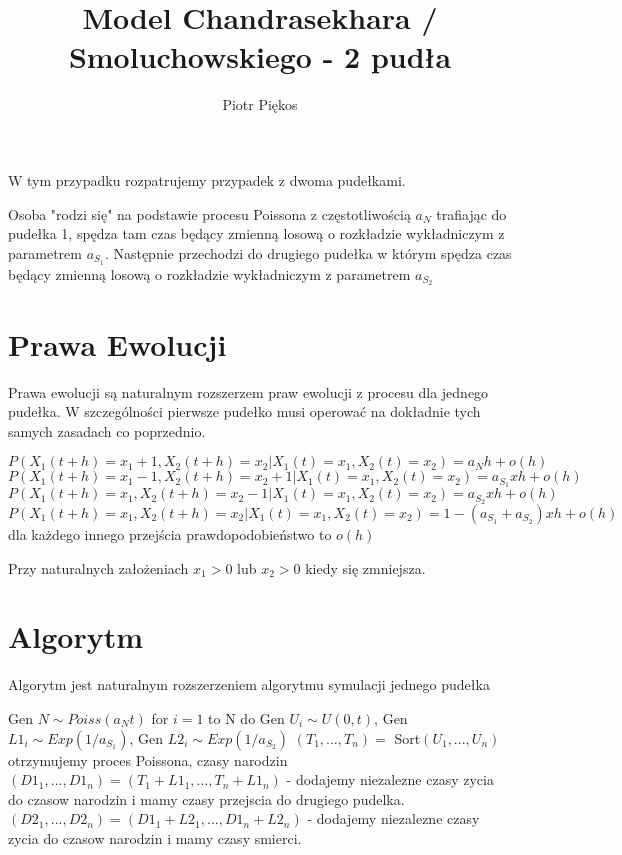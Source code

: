 \documentclass{article}
\begin{document}
\title{Model Chandrasekhara / Smoluchowskiego  - 2 pudła}
\author{Piotr Piękos}

\maketitle

W tym przypadku rozpatrujemy przypadek z dwoma pudełkami. 

Osoba "rodzi się" na podstawie procesu Poissona z częstotliwością $a_N$ trafiając do pudełka 1, spędza tam czas będący zmienną losową o rozkładzie wykładniczym z parametrem $a_{S_1}$. Następnie przechodzi do drugiego pudełka w którym spędza czas będący zmienną losową o rozkładzie wykładniczym z parametrem $a_{S_2}$
\section{Prawa Ewolucji}

Prawa ewolucji są naturalnym rozszerzem praw ewolucji z procesu dla jednego pudełka. W szczególności pierwsze pudełko musi operować na dokładnie tych samych zasadach co poprzednio.

\[P(X_1(t+h) = x_1 + 1, X_2(t+h)=x_2 | X_1(t) = x_1, X_2(t) = x_2) = a_N h + o(h)\]
\[P(X_1(t+h) = x_1 - 1, X_2(t+h)=x_2 + 1| X_1(t) = x_1, X_2(t) = x_2) = a_{S_1} xh + o(h)\]
\[P(X_1(t+h) = x_1, X_2(t+h)=x_2 - 1| X_1(t) = x_1, X_2(t) = x_2) = a_{S_2} xh + o(h)\]
\[P(X_1(t+h) = x_1, X_2(t+h)=x_2| X_1(t) = x_1, X_2(t) = x_2) = 1 - (a_{S_1}  + a_{S_2})xh + o(h)\]
dla każdego innego przejścia prawdopodobieństwo to $o(h)$

Przy naturalnych założeniach $x_1 > 0$ lub $x_2 > 0$ kiedy się zmniejsza.

\section{Algorytm}

Algorytm jest naturalnym rozszerzeniem algorytmu symulacji jednego pudełka



\begin{algorithmic}
\State Gen $N \sim \textit{Poiss}(a_Nt)$
\State for $i = 1$ to N do Gen $U_i \sim U(0, t)$, Gen $L1_i \sim \textit{Exp}(1/a_{S_1})$, Gen $L2_i \sim \textit{Exp}(1/a_{S_2})$
\State $(T_1, ..., T_n) =$ Sort$(U_1, ..., U_n)$ otrzymujemy proces Poissona, czasy narodzin
\State $(D1_1, ..., D1_n) = (T_1 + L1_1, ..., T_n + L1_n)$ - dodajemy niezalezne czasy zycia do czasow narodzin i mamy czasy przejscia do drugiego pudelka.
\State $(D2_1, ..., D2_n) = (D1_1 + L2_1, ..., D1_n + L2_n)$ - dodajemy niezalezne czasy zycia do czasow narodzin i mamy czasy smierci.
\end{algorithmic}  
\end{document}
